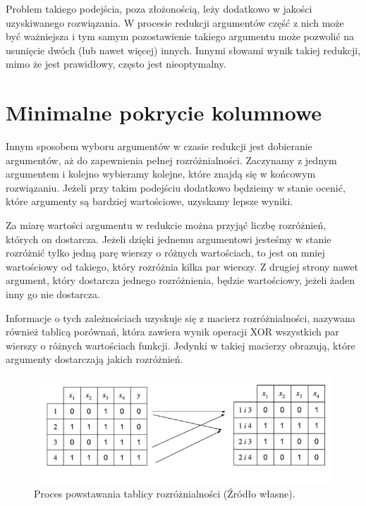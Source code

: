 Problem takiego podejścia,
poza złożonością,
leży dodatkowo w jakości uzyskiwanego rozwiązania.
W procesie redukcji argumentów część z nich może być ważniejsza
i tym samym pozostawienie takiego argumentu może pozwolić na usunięcie dwóch (lub nawet więcej) innych.
Innymi słowami wynik takiej redukcji,
mimo że jest prawidłowy,
często jest nieoptymalny.

\section{Minimalne pokrycie kolumnowe}

Innym sposobem wyboru argumentów w czasie redukcji jest dobieranie argumentów,
aż do zapewnienia pełnej rozróżnialności.
Zaczynamy z jednym argumentem i kolejno wybieramy kolejne,
które znajdą się w końcowym rozwiązaniu.
Jeżeli przy takim podejściu dodatkowo będziemy w stanie ocenić,
które argumenty są bardziej wartościowe,
uzyskamy lepsze wyniki.

Za miarę wartości argumentu w redukcie można przyjąć liczbę rozróżnień,
których on dostarcza.
Jeżeli dzięki jednemu argumentowi jesteśmy w stanie rozróżnić tylko jedną parę wierszy o różnych wartościach,
to jest on mniej wartościowy od takiego,
który rozróżnia kilka par wierszy.
Z drugiej strony nawet argument,
który dostarcza jednego rozróżnienia,
będzie wartościowy,
jeżeli żaden inny go nie dostarcza.

Informacje o tych zależnościach uzyskuje się z macierz rozróżnialności, nazywana również tablicą porównań,
która zawiera wynik operacji XOR wszystkich par wierszy o różnych wartościach funkcji.
Jedynki w takiej macierzy obrazują,
które argumenty dostarczają jakich rozróżnień.

\begin{figure}[H]
\centering
\includegraphics[width = 13cm]{chapter02/discernibility-table.png}
\caption{Proces powstawania tablicy rozróżnialności (Źródło własne).}
\end{figure}

